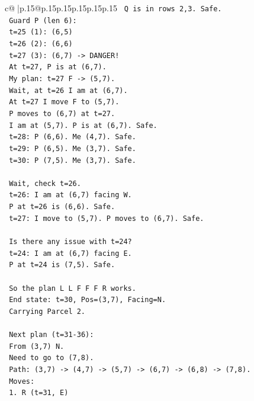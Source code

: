 \documentclass{article}
\begin{document}
{\begin{supertabular}{c@{$\;$}|p{.15\linewidth}@{}p{.15\linewidth}p{.15\linewidth}p{.15\linewidth}p{.15\linewidth}p{.15\linewidth}}
{{{\texttt{   Q is in rows 2,3. Safe.} \\
\texttt{   Guard P (len 6):} \\
\texttt{   t=25 (1): (6,5)} \\
\texttt{   t=26 (2): (6,6)} \\
\texttt{   t=27 (3): (6,7) {-}> DANGER!} \\
\texttt{   At t=27, P is at (6,7).} \\
\texttt{   My plan: t=27 F {-}> (5,7).} \\
\texttt{   Wait, at t=26 I am at (6,7).} \\
\texttt{   At t=27 I move F to (5,7).} \\
\texttt{   P moves to (6,7) at t=27.} \\
\texttt{   I am at (5,7). P is at (6,7). Safe.} \\
\texttt{   t=28: P (6,6). Me (4,7). Safe.} \\
\texttt{   t=29: P (6,5). Me (3,7). Safe.} \\
\texttt{   t=30: P (7,5). Me (3,7). Safe.} \\
\\ 
\texttt{   Wait, check t=26.} \\
\texttt{   t=26: I am at (6,7) facing W.} \\
\texttt{   P at t=26 is (6,6). Safe.} \\
\texttt{   t=27: I move to (5,7). P moves to (6,7). Safe.} \\
\\ 
\texttt{   Is there any issue with t=24?} \\
\texttt{   t=24: I am at (6,7) facing E.} \\
\texttt{   P at t=24 is (7,5). Safe.} \\
\\ 
\texttt{   So the plan L L F F F R works.} \\
\texttt{   End state: t=30, Pos=(3,7), Facing=N.} \\
\texttt{   Carrying Parcel 2.} \\
\\ 
\texttt{   Next plan (t=31{-}36):} \\
\texttt{   From (3,7) N.} \\
\texttt{   Need to go to (7,8).} \\
\texttt{   Path: (3,7) {-}> (4,7) {-}> (5,7) {-}> (6,7) {-}> (6,8) {-}> (7,8).} \\
\texttt{   Moves:} \\
\texttt{   1. R (t=31, E)} \\
}}}
\end{supertabular}}
\end{document}
